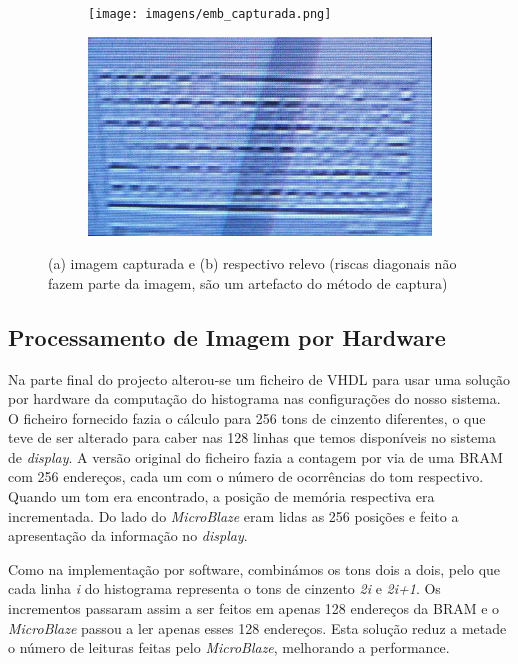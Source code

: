 \documentclass[a4paper,12pt]{article}
\begin{document}
\begin{figure}[h]
	\centering
	\begin{subfigure}[b]{0.40\textwidth}
		\centering
		\texttt{[image: imagens/emb\_capturada.png]}
		\caption{}
	\end{subfigure}
	\begin{subfigure}[b]{0.40\textwidth}
		\centering
		\includegraphics[width=\linewidth]{imagens/emb_resultado.png}
		\caption{}
	\end{subfigure}
	\caption{(a) imagem capturada e (b) respectivo relevo (riscas diagonais não fazem parte da imagem, são um artefacto do método de captura)}
	\label{fig:relevo}
\end{figure}
\FloatBarrier

\subsection{Processamento de Imagem por Hardware}
Na parte final do projecto alterou-se um ficheiro de VHDL para usar uma solução por hardware da computação do histograma nas configurações do nosso sistema. O ficheiro fornecido fazia o cálculo para 256 tons de cinzento diferentes, o que teve de ser alterado para caber nas 128 linhas que temos disponíveis no sistema de \textit{display}. A versão original do ficheiro fazia a contagem por via de uma BRAM com 256 endereços, cada um com o número de ocorrências do tom respectivo. Quando um tom era encontrado, a posição de memória respectiva era incrementada. Do lado do \textit{MicroBlaze} eram lidas as 256 posições e feito a apresentação da informação no \textit{display}. 

Como na implementação por software, combinámos os tons dois a dois, pelo que cada linha \textit{i} do histograma representa o tons de cinzento \textit{2i} e \textit{2i+1}. Os incrementos passaram assim a ser feitos em apenas 128 endereços da BRAM e o \textit{MicroBlaze} passou a ler apenas esses 128 endereços. Esta solução reduz a metade o número de leituras feitas pelo \textit{MicroBlaze}, melhorando a performance.
\end{document}
